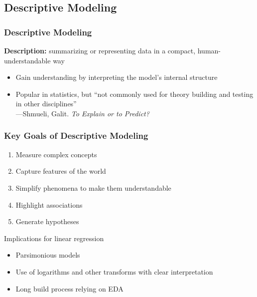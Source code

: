 \documentclass[12pt, block=fill]{beamer}
\begin{document}
\subsection{Descriptive Modeling}

\begin{frame}
  \frametitle{Descriptive Modeling}
  \textbf{Description:} summarizing or representing data in a compact,
  human-understandable way
 
  \begin{itemize}
  \item Gain understanding by interpreting the model's internal
    structure
  \item Popular in statistics, but ``not commonly used for theory
    building
    and testing in other disciplines''\\
    \hspace{1cm}—Shmueli, Galit.\textit{ To Explain or to Predict?}
  \end{itemize}

\end{frame}

\begin{frame}
  \frametitle{Key Goals of Descriptive Modeling}
  
  \begin{enumerate}
  \item Measure complex concepts 
  \item Capture features of the world 
  \item Simplify phenomena to make them understandable
  \item Highlight associations
  \item Generate hypotheses
  \end{enumerate}
  
  Implications for linear regression
  \begin{itemize}
  \item Parsimonious models
  \item Use of logarithms and other transforms with clear
    interpretation
  \item Long build process relying on EDA
  \end{itemize}
\end{frame}
\end{document}
